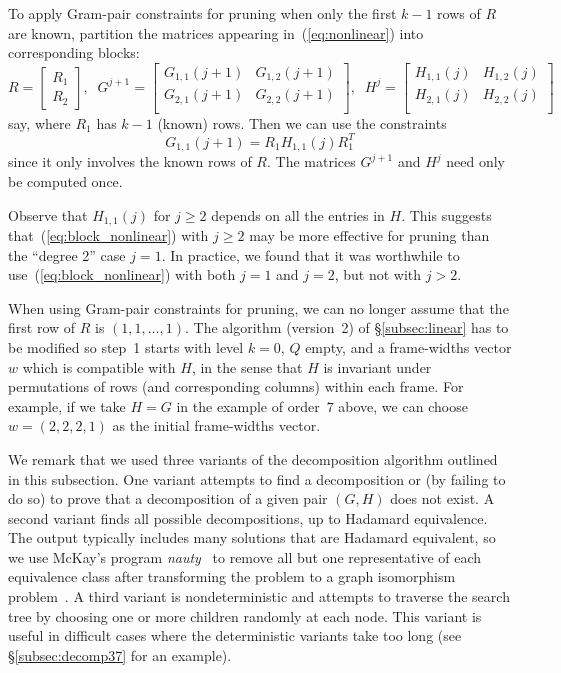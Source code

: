 \documentclass[11pt,a4paper]{article}
\begin{document}
To apply Gram-pair constraints for pruning 
when only the first $k-1$ rows of $R$ are known, 
partition the matrices appearing in~(\ref{eq:nonlinear}) 
into corresponding blocks:
\[
R = \left[\begin{matrix} R_1\\R_2 \end{matrix}\right],\;\;
G^{j+1} = \left[\begin{matrix} G_{1,1}{(j+1)} & G_{1,2}{(j+1)}\\
            G_{2,1}{(j+1)} & G_{2,2}{(j+1)}\\\end{matrix}\right],\;\;
H^j = \left[\begin{matrix} H_{1,1}{(j)} & H_{1,2}{(j)}\\
            H_{2,1}{(j)} & H_{2,2}{(j)}\\ \end{matrix}\right] 
\]
say, where $R_1$ has $k-1$ (known) rows.  Then we can use the constraints
\begin{equation}
G_{1,1}{(j+1)} = R_1 H_{1,1}{(j)} R_1^T		\label{eq:block_nonlinear}
\end{equation}
since it only involves the known rows of $R$.
The matrices $G^{j+1}$ and $H^j$ need only be computed once.

Observe that $H_{1,1}{(j)}$ for $j \ge 2$ 
depends on all the entries in $H$.
This suggests that~(\ref{eq:block_nonlinear}) with $j \ge 2$ may be
more effective for pruning than the ``degree 2'' case $j = 1$.
In practice, we found that it was worthwhile to 
use~(\ref{eq:block_nonlinear}) with both $j = 1$ and $j = 2$, but 
not with $j>2$.

When using Gram-pair constraints for pruning, we can no longer
assume that the first row of $R$ is $(1, 1, \ldots, 1)$.
The algorithm (version~2) of \S\ref{subsec:linear} has to be modified so
step~1 starts with level $k=0$, $Q$ empty, 
and a frame-widths vector $w$ which
is compatible with $H$, in the sense that $H$ is invariant under
permutations of rows (and corresponding columns) within each frame.
For example, if we take $H = G$ in the example of order~$7$ above,
we can choose $w = (2, 2, 2, 1)$ as the initial frame-widths vector.

We remark that we used three variants of the decomposition
algorithm outlined in this subsection.  One variant attempts to find
a decomposition or (by failing to do so) to prove that a decomposition
of a given pair $(G,H)$ does not exist. A second variant finds all possible
decompositions, up to Hadamard equivalence. The output typically includes
many solutions that are Hadamard equivalent, so we use McKay's program
\emph{nauty}~\cite{nauty} to remove all but one representative of each 
equivalence class after transforming the problem to a graph isomorphism
problem~\cite{McKay79}.  A third variant is nondeterministic and attempts
to traverse the search tree by choosing one or more children randomly at
each node. This variant is useful in difficult cases where the deterministic
variants take too long (see \S\ref{subsec:decomp37} for an example).
\end{document}

